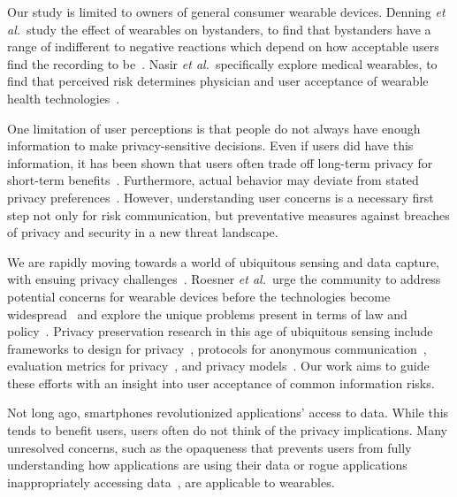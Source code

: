 \documentclass[conference]{IEEEtran}
\begin{document}
Our study is limited to owners of general consumer wearable devices. Denning {\it et al.}\ study the effect of wearables on bystanders, to find that bystanders have a range of indifferent to negative reactions which depend on how acceptable users find the recording to be~\cite{Denning2014}. Nasir {\it et al.}\ specifically explore medical wearables, to find that perceived risk determines physician and user acceptance of wearable health technologies~\cite{nasir2015consumers}. 

One limitation of user perceptions is that people do not always have enough information to make privacy-sensitive decisions. Even if users did have this information, it has been shown that users often trade off long-term privacy for short-term benefits~\cite{acquisti2005privacy}. Furthermore, actual behavior may deviate from stated privacy preferences~\cite{spiekermann2001privacy}. However, understanding user concerns is a necessary first step not only for risk communication, but preventative measures against breaches of privacy and security in a new threat landscape. 

 We are rapidly moving towards a world of ubiquitous sensing and data capture, with ensuing privacy challenges~\cite{abowd2000charting,palen2003unpacking,camp2000internet}. Roesner {\it et al.}\ urge the community to address potential concerns for wearable devices before the technologies become widespread~\cite{roesner2014security} and explore the unique problems present in terms of law and policy~\cite{roesner2014augmented}. Privacy preservation research in this age of ubiquitous sensing include frameworks to design for privacy~\cite{bellotti1993design,camp2003designing,langheinrich2001privacy}, protocols for anonymous communication~\cite{cornelius2008anonysense}, evaluation metrics for privacy~\cite{scholtz2004toward}, and privacy models~\cite{hong2004privacy, jiang2002approximate}. Our work aims to guide these efforts with an insight into user acceptance of common information risks. 

 Not long ago, smartphones revolutionized applications' access to  data. While this tends to benefit users, users often do not think of the privacy implications. Many unresolved concerns, such as the opaqueness that prevents users from fully understanding how applications are using their data or rogue applications inappropriately accessing data~\cite{1_kane_2010, zhou2011taming}, are applicable to wearables.
\end{document}
